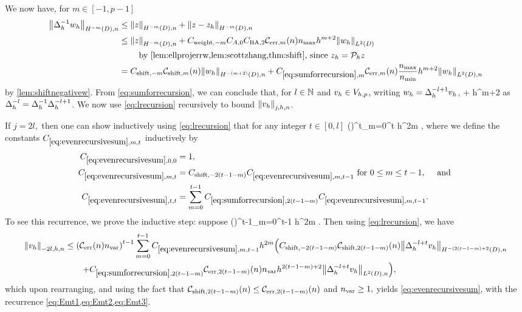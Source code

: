 We now have, for $m \in [-1,p-1]$
\begin{align}
\NHnfn{-m}{D}{\DeltahI \wh} &\leq \NHnfn{-m}{D}{z} + \NHnfn{-m}{D}{z-\zh}\nonumber\\
&\leq \NHnfn{-m}{D}{z} + \Cwfn{-m}  \CAfn{0} \CSZfn{2} \errn{m} \nmax h^{m+2} \NLtD{\wh}\nonumber\\
&\quad\quad\text{ by \cref{lem:ellprojerrw,lem:scottzhang,thm:shift}, since }\zh = \Ph z\nonumber\\
&= \Cshiftfn{m} \shiftn{m} \NHnfn{-(m+2)}{D}{\wh} + \Cm \errn{m} \frac{\nmax}{\nmin} h^{m+2} \NLtDn{\wh}\label{eq:sumforrecursion}
\end{align}
by \cref{lem:shiftnegativew}.
From \cref{eq:sumforrecursion}, we can conclude that, for $l \in \mathbb N$ and $v_{h} \in V_{h,p}$, writing $w_{h} = \Delta_{h}^{-l+1} v_{h}$,
\beq\label{eq:lrecursion}
 \leq {}  + \Cm {} \frac{\nmax}{\nmin} h^{m+2} \NLtDn{\Deltahmlpo \vh}
\eeq
as $\Delta_{h}^{-l} = \Delta_{h}^{-1} \Delta_{h}^{-l+1}$. We now use \cref{eq:lrecursion} recursively to bound $\Nfn{j,h,n}{\vh}$.

If $j = 2l,$ then one can show inductively using \cref{eq:lrecursion} that for any integer $t \in [0,l]$
\beq\label{eq:evenrecursivesum}
 \leq \mleft(\En\nvar\mright)^t\sum_{m=0}^t  h^{2m}  ,
\eeq
where we define the constants $\Efn{m,t}$ inductively by
\begin{align}
\label{eq:Emt1}\Efn{0,0} &=1,\\
\label{eq:Emt2}\Efn{m,t} &= \Cshiftfn{2(t-1-m)} \Efn{m,t-1} \tfor 0 \leq m \leq t-1, \quad\tand\\
\label{eq:Emt3}\Efn{t,t} &= \sum_{m=0}^{t-1} \Csumrecfn{2(t-1-m)} \Efn{m,t-1}.
\end{align}
To see this recurrence, we prove the inductive step: suppose
\beqs
{} \leq \mleft(\En\nvar\mright)^{t-1}\sum_{m=0}^{t-1}  h^{2m} .
\eeqs
Then using \cref{eq:lrecursion}, we have
\begin{align*}
\Nfn{-2l,h,n}{\vh} &\leq \mleft(\En\nvar\mright)^{t-1}\sum_{m=0}^{t-1} \Efn{m,t-1} h^{2m} \mleft(\Cshiftfn{2(t-1-m)}\shiftn{2(t-1-m)} \NHnfn{-(2(t-1-m)+2}{D}{\Deltah^{-l+t} \vh}\mright.\\
&\quad\quad\mleft.+ \Csumrecfn{2(t-1-m)} \errn{2(t-1-m)} \nvar h^{2(t-1-m)+2} \NLtDn{\Deltah^{-l+t} \vh}\mright),
\end{align*}
which upon rearranging, and using the fact that $\shiftn{2(t-1-m)} \leq \errn{2(t-1-m)}$ and $n_{\mathrm{var}} \geq 1,$ yields \cref{eq:evenrecursivesum}, with the recurrence \cref{eq:Emt1,eq:Emt2,eq:Emt3}.

